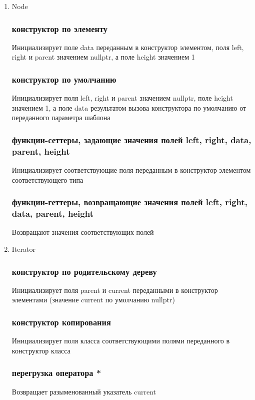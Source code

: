 \documentclass[a4paper,12pt]{article}
\begin{document}
  \begin{enumerate}
    \item Node
      \subsubsection{конструктор по элементу}
      Инициализирует поле data переданным в конструктор элементом, поля left, right и parent  значением nullptr, а поле height значением 1
      
      \subsubsection{конструктор по умолчанию}
      Инициализирует поля left, right и parent  значением nullptr, поле height значением 1, а поле data результатом вызова конструктора по умолчанию от переданного параметра шаблона
      
      \subsubsection{функции-сеттеры, задающие значения полей left, right, data, parent, height}
      Инициализирует соответствующие поля переданным в конструктор элементом соответствующего типа
      
      \subsubsection{функции-геттеры, возвращающие значения полей left, right, data, parent, height}
      Возвращают значения соответствующих полей
      
    \item Iterator
      \subsubsection{конструктор по родительскому дереву}
      Инициализирует поля parent и current переданными в конструктор элементами (значение current по умолчанию nullptr)
      
      \subsubsection{конструктор копирования}
      Инициализирует поля класса соответствующими полями переданного в конструктор класса
      
      \subsubsection{перегрузка оператора *}
      Возвращает разыменованный указатель current
      

\end{enumerate}
\end{document}
